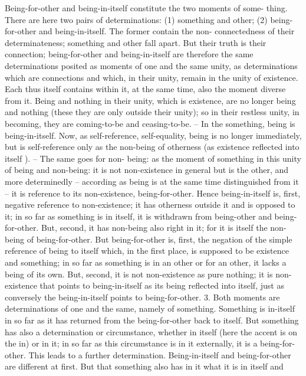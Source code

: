 Being-for-other and being-in-itself constitute the two moments of some-
thing. There are here two pairs of determinations: (1) something and
other; (2) being-for-other and being-in-itself. The former contain the non-
connectedness of their determinateness; something and other fall apart.
But their truth is their connection; being-for-other and being-in-itself are
therefore the same determinations posited as moments of one and the same
unity, as determinations which are connections and which, in their unity,
remain in the unity of existence. Each thus itself contains within it, at the
same time, also the moment diverse from it.
Being and nothing in their unity, which is existence, are no longer
being and nothing (these they are only outside their unity); so in their
restless unity, in becoming, they are coming-to-be and ceasing-to-be. – In
the something, being is being-in-itself. Now, as self-reference, self-equality,
being is no longer immediately, but is self-reference only as the non-being
of otherness (as existence reflected into itself ). – The same goes for non-
being: as the moment of something in this unity of being and non-being:
it is not non-existence in general but is the other, and more determinedly –
according as being is at the same time distinguished from it – it is reference
to its non-existence, being-for-other.
Hence being-in-itself is, first, negative reference to non-existence; it has
otherness outside it and is opposed to it; in so far as something is in itself,
it is withdrawn from being-other and being-for-other. But, second, it has
non-being also right in it; for it is itself the non-being of being-for-other.
But being-for-other is, first, the negation of the simple reference of being
to itself which, in the first place, is supposed to be existence and something;
in so far as something is in an other or for an other, it lacks a being of
its own. But, second, it is not non-existence as pure nothing; it is non-
existence that points to being-in-itself as its being reflected into itself, just
as conversely the being-in-itself points to being-for-other.
3. Both moments are determinations of one and the same, namely of
something. Something is in-itself in so far as it has returned from the
being-for-other back to itself. But something has also a determination or
circumstance, whether in itself (here the accent is on the in) or in it; in so
far as this circumstance is in it externally, it is a being-for-other.
This leads to a further determination. Being-in-itself and being-for-other
are different at first. But that something also has in it what it is in itself and
